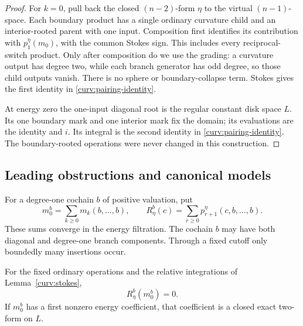\begin{proof}
For $k=0$, pull back the closed $(n-2)$-form $\eta$ to the virtual
$(n-1)$-space.  Each boundary product has a single ordinary
curvature child and an interior-rooted parent with one input.
Composition first identifies its contribution with
$p_1^\eta(m_0)$, with the common Stokes sign.  This includes every
reciprocal-switch product.  Only after composition do we use the
grading: a curvature output has degree two, while each branch
generator has odd degree, so those child outputs vanish.
There is no sphere or boundary-collapse term.  Stokes gives the
first identity in \eqref{curv:pairing-identity}.

At energy zero the one-input diagonal root is the regular constant
disk space $L$.  Its one boundary mark and one interior mark fix
the domain; its evaluations are the identity and $i$.  Its integral
is the second identity in \eqref{curv:pairing-identity}.  The
boundary-rooted operations were never changed in this construction.
\end{proof}

\subsection{Leading obstructions and canonical models}

For a degree-one cochain $b$ of positive valuation, put
\[
 m_0^b=\sum_{k\geq0}m_k(b,\ldots,b),
 \qquad
 R_\eta^b(c)=\sum_{r\geq0}p_{r+1}^\eta(c,b,\ldots,b).
\]
These sums converge in the energy filtration.  The cochain $b$ may
have both diagonal and degree-one branch components.  Through a
fixed cutoff only boundedly many insertions occur.

\begin{lemma}\label{curv:deformation}
For the fixed ordinary operations and the relative integrations of
Lemma~\ref{curv:stokes},
\begin{equation}\label{curv:deformed-pairing}
 R_\eta^b(m_0^b)=0.
\end{equation}
If $m_0^b$ has a first nonzero energy coefficient, that coefficient
is a closed exact two-form on $L$.
\end{lemma}

